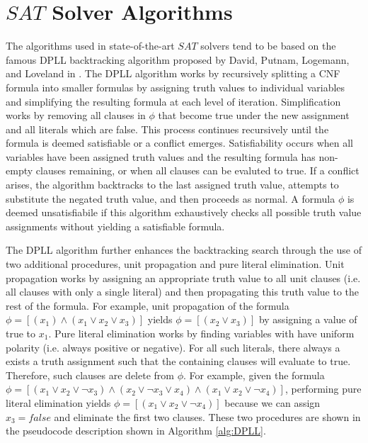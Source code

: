 \documentclass[paper=a4, fontsize=11pt]{scrartcl} %
\begin{document}
\section{$SAT$ Solver Algorithms}
The algorithms used in state-of-the-art $SAT$ solvers tend to be based on the famous
DPLL backtracking algorithm proposed by David, Putnam, Logemann, and Loveland in \cite{DPLL}.
The DPLL algorithm works by recursively splitting a CNF formula into smaller formulas
by assigning truth values to individual variables and simplifying the resulting
formula at each level of iteration. Simplification works by removing all clauses in $\phi$ that
become true under the new assignment and all literals which are false. 
This process continues recursively until the formula is deemed satisfiable
or a conflict emerges. Satisfiability occurs when all variables have been assigned truth values 
and the resulting formula has non-empty clauses remaining, or when all clauses can be
evaluted to true. If a conflict arises, the algorithm backtracks to
the last assigned truth value, attempts to substitute the negated truth value, and then proceeds
as normal. A formula $\phi$ is deemed unsatisfiabile if this algorithm exhaustively
checks all possible truth value assignments without yielding a satisfiable formula. 

The DPLL algorithm further enhances the backtracking search through the use of two additional
procedures, unit propagation and pure literal elimination. Unit propagation works by assigning
an appropriate truth value to all unit clauses (i.e. all clauses with only a single literal) and
then propagating this truth value to the rest of the formula. For example, unit propagation
of the formula $\phi = [(x_1) \land (x_1 \lor x_2 \lor x_3)]$ yields $\phi = [(x_2 \lor x_3)]$ by
assigning a value of true to $x_1$. Pure literal elimination works by finding variables
with have uniform polarity (i.e. always positive or negative). For all such literals, there
always a exists a truth assignment such that the containing clauses will evaluate to true.
Therefore, such clauses are delete from $\phi$. For example, given the formula 
$\phi = [(x_1 \lor x_2 \lor \lnot x_3) \land (x_2 \lor \lnot x_3 \lor x_4) \land (x_1 \lor x_2 \lor \lnot x_4)]$,
performing pure literal elimination yields 
$\phi = [(x_1 \lor x_2 \lor \lnot x_4)]$ because we can assign $x_3 = false$ and eliminate
the first two clauses. These two procedures are shown in the pseudocode description shown
in Algorithm \ref{alg:DPLL}.
\end{document}
